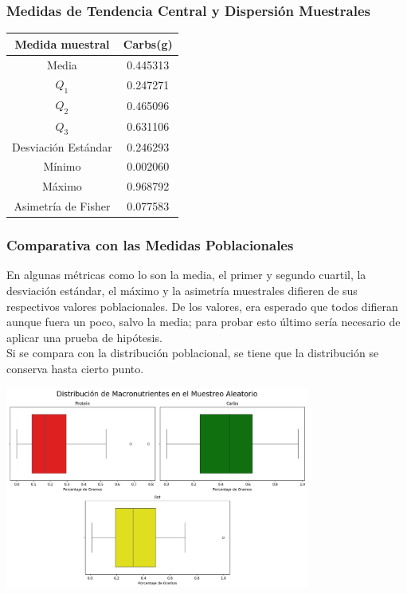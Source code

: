 \documentclass[12pt,a4paper]{article}
\begin{document}
    \subsubsection{Medidas de Tendencia Central y Dispersión Muestrales}
        \begin{center}
            \begin{tabular}{|c|c|}
                \hline
                Medida muestral & Carbs(g) \\
                \hline
                Media & 0.445313 \\
                $Q_1$ & 0.247271 \\
                $Q_2$ & 0.465096 \\
                $Q_3$ & 0.631106 \\
                Desviación Estándar & 0.246293 \\
                Mínimo & 0.002060 \\
                Máximo & 0.968792 \\
                Asimetría de Fisher & 0.077583 \\
                \hline
                \end{tabular}
        \end{center}
    
    \subsubsection{Comparativa con las Medidas Poblacionales}
        En algunas métricas como lo son la media, el primer y segundo cuartil, 
        la desviación estándar, el máximo y la asimetría muestrales 
        difieren de sus respectivos valores poblacionales. De los valores, era 
        esperado que todos difieran aunque fuera un poco, salvo la media; para 
        probar esto último sería necesario de aplicar una prueba de hipótesis.\\
        Si se compara con la distribución poblacional, se tiene que la 
        distribución se conserva hasta cierto punto.
        \begin{center}
            \includegraphics[width=0.75\textwidth]{Resources/3_01_plot_01.png}
        \end{center}
    
\end{document}

